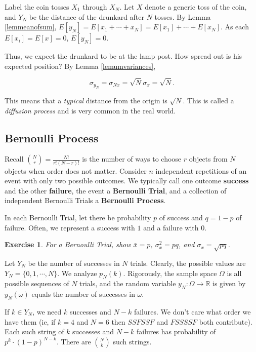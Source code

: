 \documentclass[12pt,letterpaper]{report}
\newcommand\be{\begin{equation}}
\newcommand\ee{\end{equation}}
\newcommand{\R}{\ensuremath{\mathbb{R}}}
\newtheorem{exe}[thm]{Exercise}
\begin{document}
Label the coin tosses $X_1$ through $X_N$. Let $X$ denote a
generic toss of the coin, and $Y_N$ be the distance of the
drunkard after $N$ tosses. By Lemma \ref{lemmeanofsum}, $E[y_N] =
E[x_1 + \cdots + x_N] = E[x_1] + \cdots + E[x_N]$. As each $E[x_i]
= E[x] = 0$, $E[y_N] = 0$.

Thus, we expect the drunkard to be at the lamp post. How spread
out is his expected position? By Lemma \ref{lemumvariances},

\be \sigma_{y_N} = \sigma_{N x} = \sqrt{N} \sigma_x = \sqrt{N}.\ee

This means that a \emph{typical} distance from the origin is
$\sqrt{N}$. This is called a \emph{diffusion process} and is very
common in the real world.


\subsection{Bernoulli Process}

Recall ${N \choose r}  = \frac{N!}{r!(N-r)!}$ is the number of
ways to choose $r$ objects from $N$ objects when order does not
matter. Consider $n$ independent repetitions of an event with only
two possible outcomes. We typically call one outcome
\textbf{success} and the other \textbf{failure}, the event a
\textbf{Bernoulli Trial}, and a collection of independent
Bernoulli Trials a \textbf{Bernoulli Process}.

In each Bernoulli Trial, let there be probability $p$ of success
and $q = 1-p$ of failure. Often, we represent a success with $1$
and a failure with $0$.

\begin{exe} For a Bernoulli Trial, show $\bar{x} = p$, $\sigma^2_x
= pq$, and $\sigma_x = \sqrt{pq}$. \end{exe}

Let $Y_N$ be the number of successes in $N$ trials. Clearly, the
possible values are $Y_N = \{0, 1, \cdots, N\}$. We analyze
$p_N(k)$. Rigorously, the sample space $\Omega$ is all possible
sequences of $N$ trials, and the random variable $y_N: \Omega
\rightarrow \R$ is given by $y_N(\omega)$ equals the number of
successes in $\omega$.

If $k \in Y_N$, we need $k$ successes and $N-k$ failures. We don't
care what order we have them (ie, if $k = 4$ and $N = 6$ then
$SSFSSF$ and $FSSSSF$ both contribute). Each such string of $k$
successes and $N-k$ failures has probability of $p^k \cdot
(1-p)^{N-k}$. There are $N \choose k$ such strings.
\end{document}
